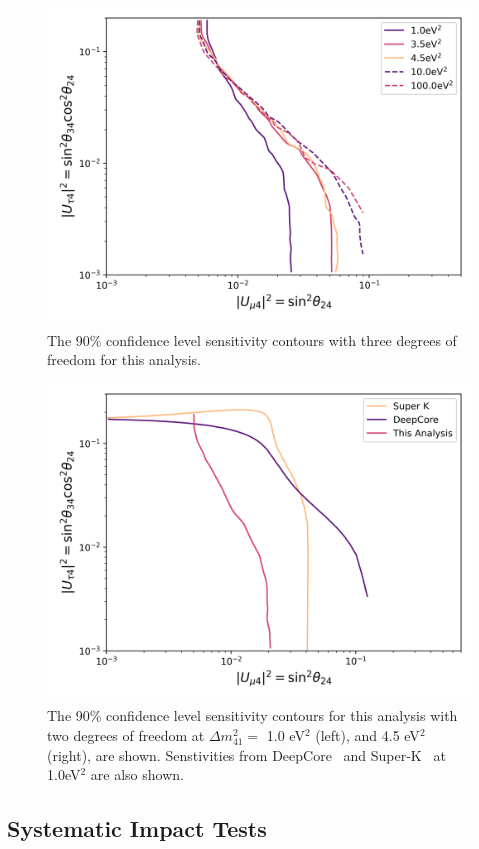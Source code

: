 \documentclass[main.tex]{subfiles}
\begin{document}
\begin{figure}
    \centering
    \includegraphics[width=0.7\linewidth]{figures/true_sensitivity_Realization_Asimov_sterile_0_cl0.9_dof3.png}
    \caption{The 90\% confidence level sensitivity contours with three degrees of freedom for this analysis.}\label{fig:asimov_sense}
\end{figure}

\begin{figure}
    \centering
    \includegraphics[width=0.45\linewidth]{figures/comparison.png}
    \caption{The 90\% confidence level sensitivity contours for this analysis with two degrees of freedom at $\Delta m_{41}^{2}=$ 1.0 eV$^{2}$ (left), and  4.5 eV$^{2}$ (right), are shown. Senstivities from DeepCore~\cite{Aartsen_2017_dc} and Super-K~\cite{PhysRevD.91.052019} at 1.0eV$^{2}$ are also shown.}\label{fig:asimov_compare}
\end{figure}



\subsection{Systematic Impact Tests}
\end{document}
